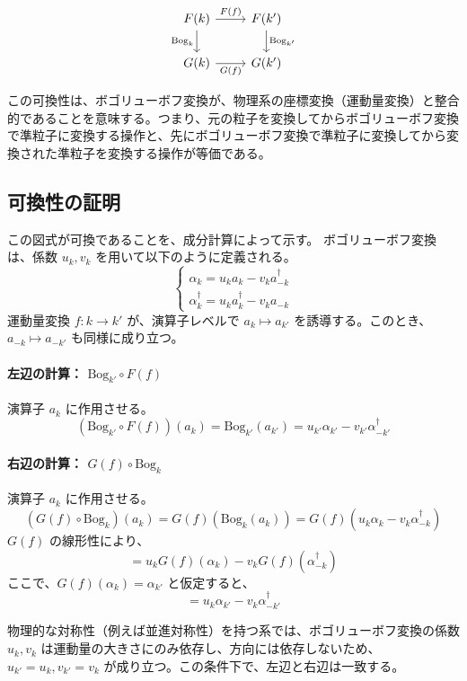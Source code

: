 \documentclass[uplatex,a4j,12pt,dvipdfmx]{jsarticle}
\begin{document}
\[
	\begin{tikzcd}
		F(k) \arrow[r, "F(f)"] \arrow[d, "\text{Bog}_{k}"'] & F(k') \arrow[d, "\text{Bog}_{k'}"] \\
		G(k) \arrow[r, "G(f)"'] & G(k')
	\end{tikzcd}
\]

この可換性は、ボゴリューボフ変換が、物理系の座標変換（運動量変換）と整合的であることを意味する。つまり、元の粒子を変換してからボゴリューボフ変換で準粒子に変換する操作と、先にボゴリューボフ変換で準粒子に変換してから変換された準粒子を変換する操作が等価である。

\subsection{可換性の証明}

この図式が可換であることを、成分計算によって示す。
ボゴリューボフ変換は、係数 $u_{k}, v_{k}$ を用いて以下のように定義される。
\[
	\begin{cases}
		\alpha_{k} = u_{k} a_{k} - v_{k} a_{-k}^{\dagger} \\
		\alpha_{k}^{\dagger} = u_{k} a_{k}^{\dagger} - v_{k} a_{-k}
	\end{cases}
\]
運動量変換 $f: k \to k'$ が、演算子レベルで $a_{k} \mapsto a_{k'}$ を誘導する。このとき、 $a_{-k} \mapsto a_{-k'}$ も同様に成り立つ。

\paragraph{左辺の計算： $\text{Bog}_{k'} \circ F(f)$}
演算子 $a_{k}$ に作用させる。
\[
	(\text{Bog}_{k'} \circ F(f))(a_{k}) = \text{Bog}_{k'}(a_{k'}) = u_{k'} \alpha_{k'} - v_{k'} \alpha_{-k'}^{\dagger}
\]

\paragraph{右辺の計算： $G(f) \circ \text{Bog}_{k}$}
演算子 $a_{k}$ に作用させる。
\[
	(G(f) \circ \text{Bog}_{k})(a_{k}) = G(f)(\text{Bog}_{k}(a_{k})) = G(f)(u_{k} \alpha_{k} - v_{k} \alpha_{-k}^{\dagger})
\]
$G(f)$ の線形性により、
\[
	= u_{k} G(f)(\alpha_{k}) - v_{k} G(f)(\alpha_{-k}^{\dagger})
\]
ここで、$G(f)(\alpha_{k}) = \alpha_{k'}$ と仮定すると、
\[
	= u_{k} \alpha_{k'} - v_{k} \alpha_{-k'}^{\dagger}
\]

物理的な対称性（例えば並進対称性）を持つ系では、ボゴリューボフ変換の係数 $u_{k}, v_{k}$ は運動量の大きさにのみ依存し、方向には依存しないため、 $u_{k'} = u_{k}, v_{k'} = v_{k}$ が成り立つ。この条件下で、左辺と右辺は一致する。
\end{document}

